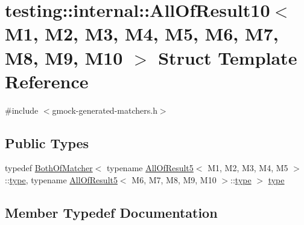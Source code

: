 \hypertarget{structtesting_1_1internal_1_1_all_of_result10}{}\section{testing\+:\+:internal\+:\+:All\+Of\+Result10$<$ M1, M2, M3, M4, M5, M6, M7, M8, M9, M10 $>$ Struct Template Reference}
\label{structtesting_1_1internal_1_1_all_of_result10}


{\ttfamily \#include $<$gmock-\/generated-\/matchers.\+h$>$}

\subsection*{Public Types}
\begin{DoxyCompactItemize}
\item 
typedef \hyperlink{classtesting_1_1internal_1_1_both_of_matcher}{Both\+Of\+Matcher}$<$ typename \hyperlink{structtesting_1_1internal_1_1_all_of_result5}{All\+Of\+Result5}$<$ M1, M2, M3, M4, M5 $>$\+::\hyperlink{structtesting_1_1internal_1_1_all_of_result10_a48d6c6de6d0d5445b212119e1f536af5}{type}, typename \hyperlink{structtesting_1_1internal_1_1_all_of_result5}{All\+Of\+Result5}$<$ M6, M7, M8, M9, M10 $>$\+::\hyperlink{structtesting_1_1internal_1_1_all_of_result10_a48d6c6de6d0d5445b212119e1f536af5}{type} $>$ \hyperlink{structtesting_1_1internal_1_1_all_of_result10_a48d6c6de6d0d5445b212119e1f536af5}{type}
\end{DoxyCompactItemize}


\subsection{Member Typedef Documentation}
\mbox{\label{structtesting_1_1internal_1_1_all_of_result10_a48d6c6de6d0d5445b212119e1f536af5}} 
